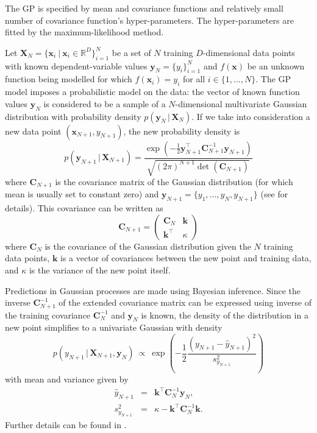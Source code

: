 \documentclass{itatnew}
\newcommand{\xx}{\mathrm{\mathbf{x}}}
\newcommand{\yy}{\mathrm{\mathbf{y}}}
\newcommand{\XX}{\mathrm{\mathbf{X}}}
\newcommand{\CC}{\mathrm{\mathbf{C}}}
\begin{document}
The GP is specified by mean and covariance functions and relatively small number of covariance function's hyper-parameters. The hyper-parameters are fitted by the maximum-likelihood method.

Let $\XX_N = \{\xx_i \ | \ \xx_i \in \mathbb{R}^{D}\}_{i=1}^{N}$ be a set of $N$ training $D$-dimensional data points with known dependent-variable values $\yy_N = \{y_i\}_{i=1}^{N}$ and $f(\xx)$ be an unknown function being modelled for which $f(\xx_i) = y_i$ for all $i \in \{1,\ldots,N\}$. The GP model imposes a probabilistic model on the data: the vector of known function values $\yy_N$ is considered to be a sample of a $N$-dimensional multivariate Gaussian distribution with probability density $p(\yy_N \, | \, \XX_N)$. If we take into consideration a new data point $(\xx_{N+1}, y_{N+1})$, the new probability density is
\begin{equation}
p(\yy_{N+1} \, | \, \XX_{N+1}) = \frac { \exp(-\frac{1}{2} \yy^\top_{N+1} \CC^{-1}_{N+1} \yy_{N+1}) } { \sqrt{(2\pi)^{N+1} \det(\CC_{N+1})} }
\end{equation}
where $\CC_{N+1}$ is the covariance matrix of the Gaussian distribution (for which mean is usually set to constant zero) and 
$\yy_{N+1} = \{y_1,\ldots,y_N, y_{N+1}\}$ (see \cite{buche_accelerating_2005} for details). This covariance can be written as
\begin{equation}
\CC_{N+1} = \left( \begin{array}{cc} \CC_N & \mathbf{k} \\ \mathbf{k}^\top & \kappa \end{array} \right)
\end{equation}
where $\CC_N$ is the covariance of the Gaussian distribution given the $N$ training data points, $\mathbf{k}$ is a vector of covariances between the new point and training data, and $\kappa$ is the variance of the new point itself.

Predictions in Gaussian processes are made using Bayesian inference. Since the inverse $\CC^{-1}_{N+1}$ of the extended covariance matrix can be expressed using inverse of the training covariance $\CC^{-1}_N$ and $\yy_N$ is known, the density of the distribution in a new point simplifies to a univariate Gaussian with density
\begin{equation}
p(y_{N+1} \, | \, \XX_{N+1}, \yy_N) \ \varpropto \ \exp \left( -\frac{1}{2} \frac {(y_{N+1} - \hat{y}_{N+1})^2} {s^2_{y_{N+1}}} \right)
\label{univariate-density}
\end{equation}
with mean and variance given by
\begin{eqnarray}
\hat{y}_{N+1} & = & \mathbf{k}^\top \CC^{-1}_N \yy_N, \\
s^2_{y_{N+1}} & = & \kappa - \mathbf{k}^\top \CC^{-1}_N \mathbf{k}.
\end{eqnarray}
Further details can be found in \cite{buche_accelerating_2005}.
\end{document}
